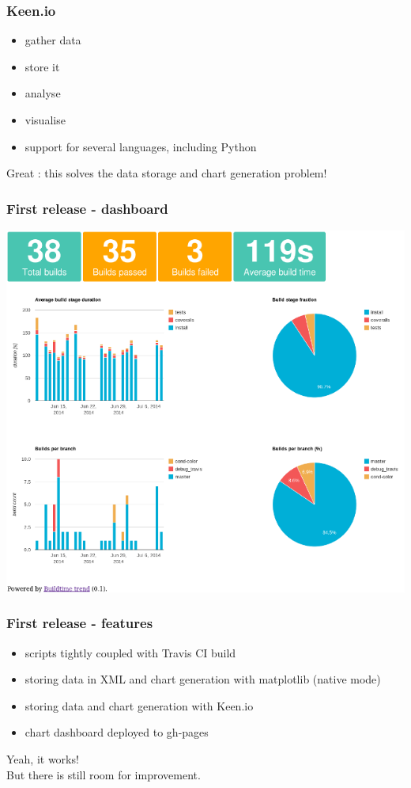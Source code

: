 \documentclass[14pt]{beamer}
\begin{document}
  \begin{frame}
    \frametitle{Keen.io}
    \begin{itemize}
      \item gather data
      \item store it
      \item analyse
      \item visualise
      \item support for several languages, including Python
    \end{itemize}
    Great : this solves the data storage and chart generation problem!
  \end{frame}
  \begin{frame}
    \frametitle{First release - dashboard}
    \includegraphics[scale=.45]{example_dashboard.png}
  \end{frame}
  \begin{frame}
    \frametitle{First release - features}
    \begin{itemize}
      \item scripts tightly coupled with Travis CI build
      \item storing data in XML and chart generation with matplotlib (native mode)
      \item storing data and chart generation with Keen.io
      \item chart dashboard deployed to gh-pages
    \end{itemize}
    Yeah, it works!\\
    \pause
    But there is still room for improvement.
  \end{frame}
\end{document}

